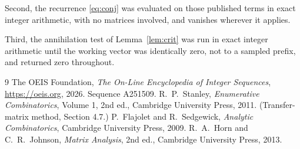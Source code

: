 \documentclass[11pt,a4paper]{article}
\theoremstyle{plain}
\theoremstyle{definition}
\begin{document}
Second, the recurrence \eqref{eq:conj} was evaluated on those published terms in exact
integer arithmetic, with no matrices involved, and vanishes wherever it applies.

Third, the annihilation test of Lemma~\ref{lem:crit} was run in exact integer arithmetic
until the working vector was identically zero, not to a sampled prefix, and returned zero
throughout.

\begin{thebibliography}{9}
 The OEIS Foundation, \emph{The On-Line Encyclopedia of Integer
Sequences}, \url{https://oeis.org}, 2026. Sequence A251509.
 R.~P.~Stanley, \emph{Enumerative Combinatorics}, Volume 1, 2nd ed.,
Cambridge University Press, 2011. (Transfer-matrix method, Section 4.7.)
 P.~Flajolet and R.~Sedgewick, \emph{Analytic Combinatorics}, Cambridge
University Press, 2009.
 R.~A.~Horn and C.~R.~Johnson, \emph{Matrix Analysis}, 2nd ed., Cambridge
University Press, 2013.
\end{thebibliography}
\end{document}
